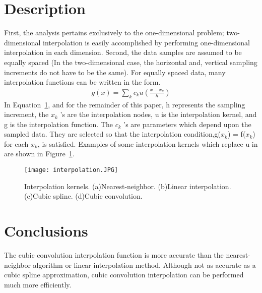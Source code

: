 \documentclass[10pt,twocolumn,letterpaper]{article}
\begin{document}
\section{Description}
First, the analysis pertains exclusively to the one-dimensional problem; two-dimensional interpolation is easily accomplished by performing one-dimensional interpolation in each dimension. Second, the data samples are assumed to be equally spaced (In the two-dimensional case, the horizontal and, vertical sampling increments do not have to be the same).
For equally spaced data, many interpolation functions can be written in the form.
\begin{align}
g(x) = \sum_k^{}c_ku(\frac{x-x_k}{h})
\end{align}
In Equation~\ref{fig:onecol}, and for the remainder of this paper, h represents the sampling increment, the $x_k$ 's are the interpolation nodes, u is the interpolation kernel, and g is the interpolation function. The $c_k$ 's are parameters which depend upon the sampled data. They are selected so that the interpolation condition,g($x_k$) = f($x_k$) for each $x_k$, is satisfied. Examples of some interpolation kernels which replace u in are shown in Figure~\ref{fig:onecol}.
\begin{figure}[t]
\begin{center}
\texttt{[image: interpolation.JPG]}
\end{center}
 \caption{Interpolation kernels. (a)Nearest-neighbor. (b)Linear interpolation. (c)Cubic spline. (d)Cubic convolution.}
\label{fig:long}
\label{fig:onecol}
\end{figure}
\section{Conclusions}

The cubic convolution interpolation function is more accurate than the nearest-neighbor algorithm or linear interpolation method. Although not as accurate as a cubic spline approximation, cubic convolution interpolation can be performed much more efficiently.

{\small


}
\end{document}
